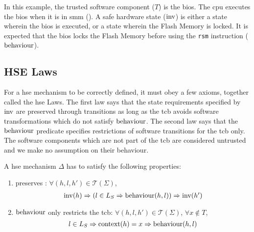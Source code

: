 \begin{example}
  \label{example:speccert:flashdef}
  In this example, the trusted software component ($T$) is the \ac{bios}.
  The \ac{cpu} executes the \ac{bios} when it is in \ac{smm} ().
  A safe hardware state ($\mathrm{inv}$) is either a state wherein the \ac{bios}
  is executed, or a state wherein the Flash Memory is locked.
  It is expected that the \ac{bios} locks the Flash Memory before using the
  \texttt{rsm} instruction ($\mathrm{behaviour}$).
\end{example}

\subsection{HSE Laws}
\label{subsec:speccert:laws}

For a \ac{hse} mechanism to be correctly defined, it must obey a few axioms,
together called the \ac{hse} Laws.
%
The first law says that the state requirements specified by $\mathrm{inv}$ are
preserved through transitions as long as the \ac{tcb} avoids software
transformations which do not satisfy $\mathrm{behaviour}$.
%
The second law says that the $\mathrm{behaviour}$ predicate specifies restrictions
of software transitions for the \ac{tcb} only.
%
The software components which are not part of the \ac{tcb} are considered
untrusted and we make no assumption on their behaviour.

\begin{definition}
  \label{def:laws}
  A \ac{hse} mechanism $\Delta$ has to satisfy the following properties:
  \begin{enumerate}
  \item {} preserves :
    $\forall (h, l, h') \in \mathcal{T}(\Sigma)$,
    \[
      \begin{array}{l} \mathrm{inv}(h) \Rightarrow (l \in L_S \Rightarrow
        \mathrm{behaviour}(h,l)) \Rightarrow \mathrm{inv}(h')
      \end{array}
    \]
  \item $\mathrm{behaviour}$ only restricts the \ac{tcb}:
    $\forall (h, l, h') \in \mathcal{T}(\Sigma)$, $\forall x \not\in T$,
    \[
      l \in L_S \Rightarrow \mathrm{context}(h) = x \Rightarrow
      \mathrm{behaviour}(h, l)
    \]
  \end{enumerate}
\end{definition}

